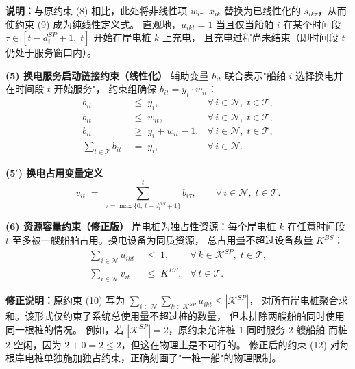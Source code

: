 \documentclass[11pt,a4paper]{article}
\begin{document}
\noindent\textbf{说明：}与原约束 (8) 相比，此处将非线性项 $w_{i\tau} \cdot x_{ik}$
替换为已线性化的 $s_{ik\tau}$，从而使约束 (9) 成为纯线性定义式。
直观地，$u_{ikt} = 1$ 当且仅当船舶 $i$ 在某个时间段
$\tau \in [t - d_i^{SP} + 1,\; t]$ 开始在岸电桩 $k$ 上充电，
且充电过程尚未结束（即时间段 $t$ 仍处于服务窗口内）。

\medskip
\noindent\textbf{(5) 换电服务启动链接约束（线性化）}\quad
辅助变量 $b_{it}$ 联合表示"船舶 $i$ 选择换电并在时间段 $t$ 开始服务"，
约束组确保 $b_{it} = y_i \cdot w_{it}$：
%
\begin{align}
  b_{it} &\;\leq\; y_i,
    & \forall\, i \in \mathcal{N},\; t \in \mathcal{T},
    \tag{10a} \\[4pt]
  b_{it} &\;\leq\; w_{it},
    & \forall\, i \in \mathcal{N},\; t \in \mathcal{T},
    \tag{10b} \\[4pt]
  b_{it} &\;\geq\; y_i + w_{it} - 1,
    & \forall\, i \in \mathcal{N},\; t \in \mathcal{T},
    \tag{10c} \\[4pt]
  \sum_{t \in \mathcal{T}} b_{it} &\;=\; y_i,
    & \forall\, i \in \mathcal{N}.
    \tag{10d}
\end{align}

\noindent\textbf{(5$'$) 换电占用变量定义}
%
\begin{equation}
  v_{it} \;=\; \sum_{\tau = \max\{0,\, t - d_i^{BS} + 1\}}^{t} b_{i\tau},
  \qquad \forall\, i \in \mathcal{N},\; t \in \mathcal{T}.
  \tag{11}
\end{equation}


\medskip
\noindent\textbf{(6) 资源容量约束（修正版）}\quad
岸电桩为独占性资源：每个岸电桩 $k$ 在任意时间段 $t$
至多被一艘船舶占用。换电设备为同质资源，
总占用量不超过设备数量 $K^{BS}$：
%
\begin{align}
  \sum_{i \in \mathcal{N}} u_{ikt} &\;\leq\; 1,
    & \forall\, k \in \mathcal{K}^{SP},\; t \in \mathcal{T},
    \tag{12} \\[4pt]
  \sum_{i \in \mathcal{N}} v_{it} &\;\leq\; K^{BS},
    & \forall\, t \in \mathcal{T}.
    \tag{13}
\end{align}

\noindent\textbf{修正说明：}原约束 (10) 写为
$\sum_{i \in \mathcal{N}} \sum_{k \in \mathcal{K}^{SP}} u_{ikt} \leq |\mathcal{K}^{SP}|$，
对所有岸电桩聚合求和。该形式仅约束了系统总使用量不超过桩的数量，
但未排除两艘船舶同时使用同一根桩的情况。
例如，若 $|\mathcal{K}^{SP}| = 2$，原约束允许桩 1 同时服务 2 艘船舶
而桩 2 空闲，因为 $2 + 0 = 2 \leq 2$，但这在物理上是不可行的。
修正后的约束 (12) 对每根岸电桩单独施加独占约束，正确刻画了"一桩一船"的物理限制。
\end{document}

